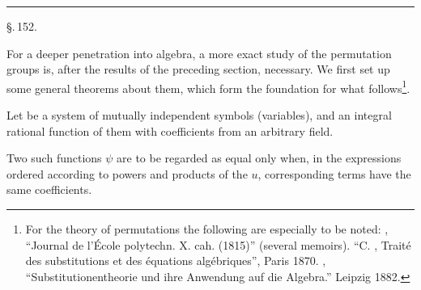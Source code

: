 \begin{center}
\end{center}

\begin{center}
\end{center}

\begin{center}
\rule{2cm}{0.4pt}
\end{center}

\begin{center}
\S.\,152.
\end{center}

\begin{center}
\end{center}

For a deeper penetration into algebra, a more exact study of the permutation groups is, after the results of the preceding section, necessary. We first set up some general theorems about them, which form the foundation for what follows\footnote{For the theory of permutations the following are especially to be noted: , ``Journal de l'École polytechn. X. cah. (1815)'' (several memoirs). ``C. , Traité des substitutions et des équations algébriques'', Paris 1870. , ``Substitutionentheorie und ihre Anwendung auf die Algebra.'' Leipzig 1882.}.

Let
be a system of mutually independent symbols (variables), and
an integral rational function of them with coefficients from an arbitrary field.

Two such functions $\psi$ are to be regarded as equal only when, in the expressions ordered according to powers and products of the $u$, corresponding terms have the same coefficients.
